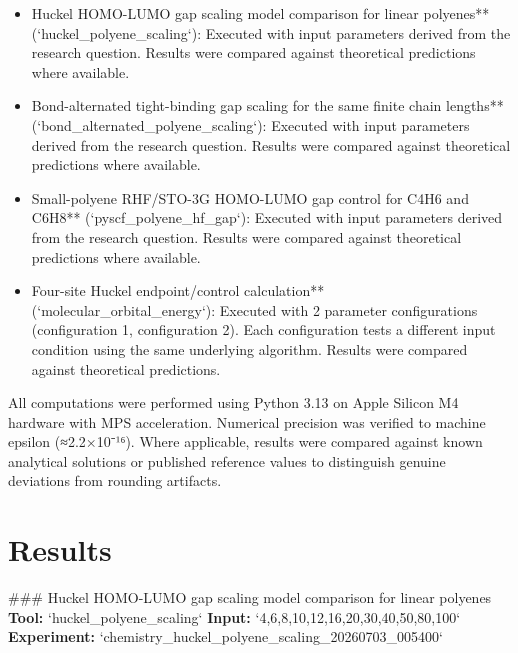 \documentclass[11pt,a4paper]{article}
\begin{document}
\begin{itemize}
\item Huckel HOMO-LUMO gap scaling model comparison for linear polyenes** (`huckel\_polyene\_scaling`): Executed with input parameters derived from the research question. Results were compared against theoretical predictions where available.
\item Bond-alternated tight-binding gap scaling for the same finite chain lengths** (`bond\_alternated\_polyene\_scaling`): Executed with input parameters derived from the research question. Results were compared against theoretical predictions where available.
\item Small-polyene RHF/STO-3G HOMO-LUMO gap control for C4H6 and C6H8** (`pyscf\_polyene\_hf\_gap`): Executed with input parameters derived from the research question. Results were compared against theoretical predictions where available.
\item Four-site Huckel endpoint/control calculation** (`molecular\_orbital\_energy`): Executed with 2 parameter configurations (configuration 1, configuration 2). Each configuration tests a different input condition using the same underlying algorithm. Results were compared against theoretical predictions.
\end{itemize}
All computations were performed using Python 3.13 on Apple Silicon M4 hardware with MPS acceleration. Numerical precision was verified to machine epsilon (≈2.2×10⁻¹⁶). Where applicable, results were compared against known analytical solutions or published reference values to distinguish genuine deviations from rounding artifacts.


\section{Results}
\#\#\# Huckel HOMO-LUMO gap scaling model comparison for linear polyenes
\textbf{Tool:} `huckel\_polyene\_scaling`
\textbf{Input:} `4,6,8,10,12,16,20,30,40,50,80,100`
\textbf{Experiment:} `chemistry\_huckel\_polyene\_scaling\_20260703\_005400`
\end{document}
